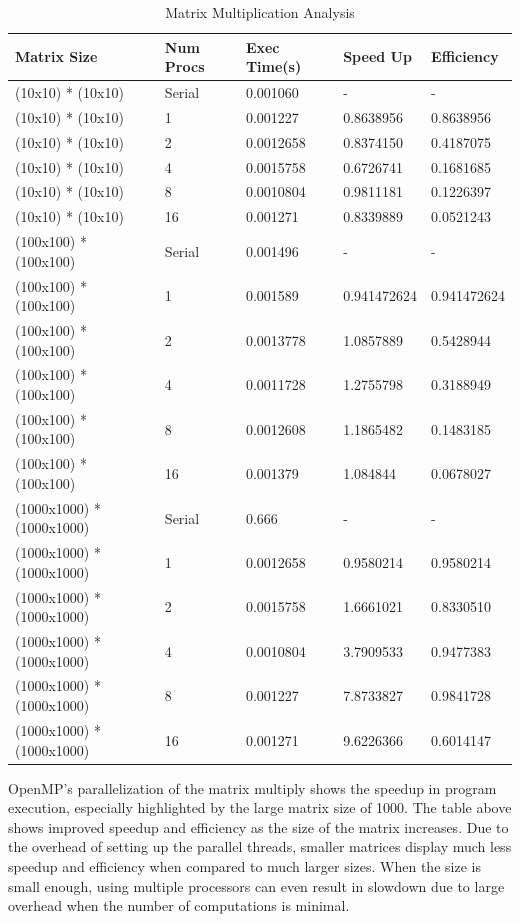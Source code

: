 \documentclass[12pt, letterpaper]{report}
\begin{document}
\begin{table}[H]
	\centering
	\begin{tabular}{ |l|l|l|l|l| }
		\hline
		\textbf{Matrix Size} & \textbf{Num Procs} & \textbf{Exec Time(s)} & \textbf{Speed Up} & \textbf{Efficiency} \\
		\hline \hline \hline
		(10x10) * (10x10) & Serial & 0.001060 & - & - \\
		\hline
		(10x10) * (10x10) & 1 & 0.001227 & 0.8638956 & 0.8638956 \\
		\hline
		(10x10) * (10x10) & 2 & 0.0012658 & 0.8374150 & 0.4187075 \\
		\hline
		(10x10) * (10x10) & 4 & 0.0015758 & 0.6726741 & 0.1681685 \\
		\hline
		(10x10) * (10x10) & 8 & 0.0010804 & 0.9811181 & 0.1226397 \\
		\hline
		(10x10) * (10x10) & 16 & 0.001271 & 0.8339889 & 0.0521243 \\
		\hline \hline \hline
		(100x100) * (100x100) & Serial & 0.001496 & - & - \\
		\hline
		(100x100) * (100x100) & 1 & 0.001589 & 0.941472624 & 0.941472624 \\
		\hline
		(100x100) * (100x100) & 2 & 0.0013778 & 1.0857889 & 0.5428944 \\
		\hline
		(100x100) * (100x100) & 4 & 0.0011728 & 1.2755798 & 0.3188949 \\
		\hline
		(100x100) * (100x100) & 8 & 0.0012608 & 1.1865482 & 0.1483185 \\
		\hline
		(100x100) * (100x100) & 16 & 0.001379 & 1.084844 & 0.0678027 \\
		\hline \hline \hline
		(1000x1000) * (1000x1000) & Serial & 0.666 & - & - \\
		\hline
		(1000x1000) * (1000x1000) & 1 & 0.0012658 & 0.9580214 & 0.9580214 \\
		\hline
		(1000x1000) * (1000x1000) & 2 & 0.0015758 & 1.6661021 & 0.8330510 \\
		\hline
		(1000x1000) * (1000x1000) & 4 & 0.0010804 & 3.7909533 & 0.9477383 \\
		\hline
		(1000x1000) * (1000x1000) & 8 & 0.001227 & 7.8733827 & 0.9841728 \\
		\hline
		(1000x1000) * (1000x1000) & 16 & 0.001271 & 9.6226366 & 0.6014147 \\
		\hline
	\end{tabular}
	\caption{Matrix Multiplication Analysis}
\end{table}

OpenMP's parallelization of the matrix multiply shows the speedup in program execution, especially highlighted by the large matrix size of 1000. The table above shows improved speedup and efficiency as the size of the matrix increases. Due to the overhead of setting up the parallel threads, smaller matrices display much less speedup and efficiency when compared to much larger sizes. When the size is small enough, using multiple processors can even result in slowdown due to large overhead when the number of computations is minimal.
\end{document}
